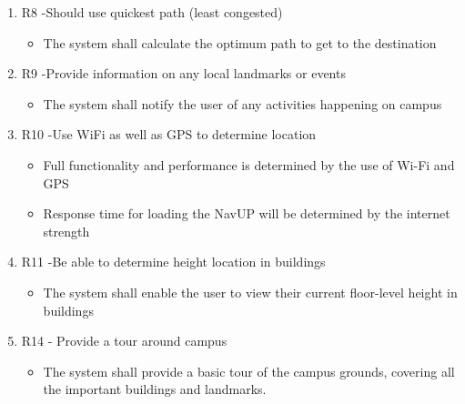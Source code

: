 \documentclass[a4paper, 12pt, one column, aas_macros]{article}
\begin{document}
\begin{enumerate}
\item R8 -Should use quickest path (least congested)

\begin{itemize}
\item The system shall calculate the optimum path to get to the destination
\end{itemize}

\item R9 -Provide information on any local landmarks or events

\begin{itemize}
\item The system shall notify the user of any activities happening on campus
\end{itemize}

\item R10 -Use WiFi as well as GPS to determine location

\begin{itemize}
\item Full functionality and performance is determined by the use of Wi-Fi and GPS 
\item Response time for loading the NavUP will be determined by the internet strength
\end{itemize}

\item R11 -Be able to determine height location in buildings

\begin{itemize}
\item The system shall enable the user to view their current floor-level height in buildings
\end{itemize}

\item R14 - Provide a tour around campus
\begin{itemize}
\item The system shall provide a basic tour of the campus grounds, covering all the important buildings and landmarks.
\end{itemize}

\end{enumerate}
\end{document}
